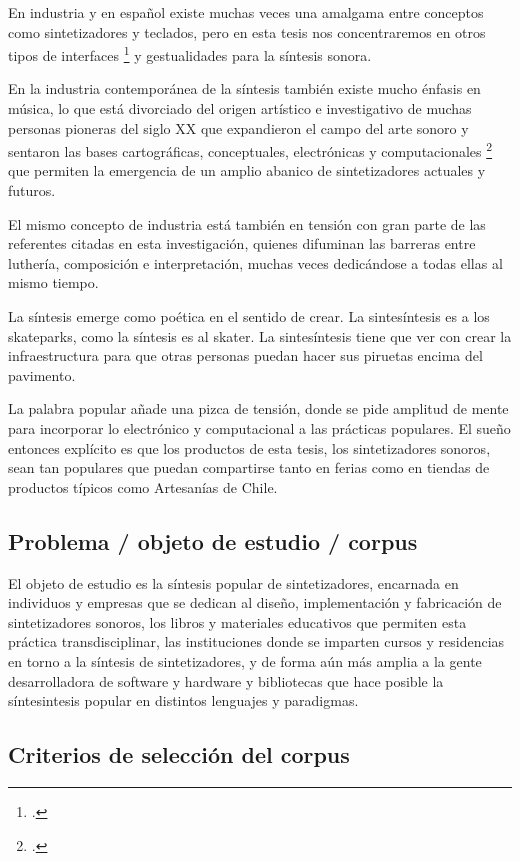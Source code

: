 \documentclass[../proyecto.tex]{subfiles}
\begin{document}
En industria y en español existe muchas veces una amalgama entre conceptos como sintetizadores y teclados, pero en esta tesis nos concentraremos en otros tipos de interfaces \footcite{bjorn_push_2021} y gestualidades para la síntesis sonora.

En la industria contemporánea de la síntesis  también existe mucho énfasis en música, lo que está divorciado del origen artístico e investigativo de muchas personas pioneras del siglo XX que expandieron el campo del arte sonoro y sentaron las bases cartográficas, conceptuales, electrónicas y computacionales \footcite{roads_computer_1996} que permiten la emergencia de un amplio abanico de sintetizadores actuales y futuros.

El mismo concepto de industria está también en tensión con gran parte de las referentes citadas en esta investigación, quienes difuminan las barreras entre luthería, composición e interpretación, muchas veces dedicándose a todas ellas al mismo tiempo.

La síntesis emerge como poética en el sentido de crear. La sintesíntesis es a los skateparks, como la síntesis es al skater. La sintesíntesis tiene que ver con crear la infraestructura para que otras personas puedan hacer sus piruetas encima del pavimento.

La palabra popular añade una pizca de tensión, donde se pide amplitud de mente para incorporar lo electrónico y computacional a las prácticas populares. El sueño entonces explícito es que los productos de esta tesis, los sintetizadores sonoros, sean tan populares que puedan compartirse tanto en ferias como en tiendas de productos típicos como Artesanías de Chile. 

\subsection{Problema / objeto de estudio / corpus}

El objeto de estudio es la síntesis popular de sintetizadores, encarnada en individuos y empresas que se dedican al diseño, implementación y fabricación de sintetizadores sonoros, los libros y materiales educativos que permiten esta práctica transdisciplinar, las instituciones donde se imparten cursos y residencias en torno a la síntesis de sintetizadores, y de forma aún más amplia a la gente desarrolladora de software y hardware y bibliotecas que hace posible la síntesintesis popular en distintos lenguajes y paradigmas.

\subsection{Criterios de selección del corpus}
\end{document}
